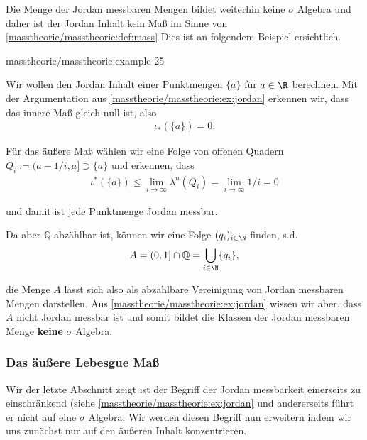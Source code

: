 \documentclass[letterpaper,10pt,german]{jupyterBook}
\begin{document}
\par
Die Menge der Jordan messbaren Mengen bildet weiterhin keine \(\sigma\) Algebra und daher ist der Jordan Inhalt kein Maß im Sinne von \cref{masstheorie/masstheorie:def:mass}  Dies ist an folgendem Beispiel ersichtlich.
\begin{example}{}{masstheorie/masstheorie:example-25}



\par
Wir wollen den Jordan Inhalt einer Punktmengen \(\{a\}\) für \(a\in\R\) berechnen. Mit der Argumentation aus \cref{masstheorie/masstheorie:ex:jordan} erkennen wir, dass das innere Maß gleich null ist, also
\begin{align*}
\iota_\ast(\{a\}) = 0.
\end{align*}
\par
Für das äußere Maß wählen wir eine Folge von offenen Quadern \(Q_i:= (a-1/i, a] \supset \{a\}\) und erkennen, dass
\begin{align*}
\iota^\ast(\{a\})\leq \lim_{i\to\infty} \lambda^n(Q_i) = \lim_{i\to\infty} 1/i = 0
\end{align*}
\par
und damit ist jede Punktmenge Jordan messbar.

\par
Da aber \(\mathbb{Q}\) abzählbar ist, können wir eine Folge \((q_i)_{i\in\N}\) finden, s.d.
\begin{align*}
A = (0,1]\cap \mathbb{Q} = \bigcup_{i\in\N} \{q_i\},
\end{align*}
\par
die Menge \(A\) lässt sich also als abzählbare Vereinigung von Jordan messbaren Mengen darstellen. Aus \cref{masstheorie/masstheorie:ex:jordan} wissen wir aber, dass \(A\) nicht Jordan messbar ist und somit bildet die Klassen der Jordan messbaren Menge \textbf{keine} \(\sigma\) Algebra.
\end{example}


\subsubsection{Das äußere Lebesgue Maß}
\label{\detokenize{masstheorie/masstheorie:das-auszere-lebesgue-masz}}
\par
Wir der letzte Abschnitt zeigt ist der Begriff der Jordan messbarkeit einerseits zu einschränkend (siehe \cref{masstheorie/masstheorie:ex:jordan}  und andererseits führt er nicht auf eine \(\sigma\) Algebra. Wir werden diesen Begriff nun erweitern indem wir uns zunächst nur auf den äußeren Inhalt konzentrieren.
\end{document}

